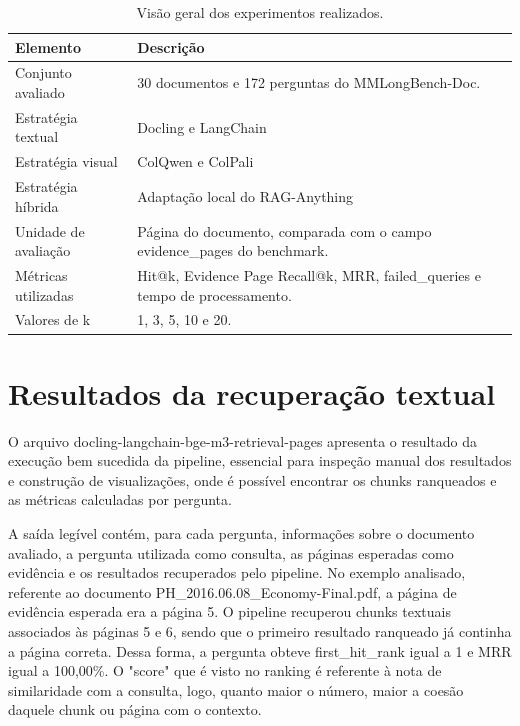 \begin{table}[htbp]
\centering
\caption{Visão geral dos experimentos realizados.}
\label{tab:visao-geral-experimentos}
\small
\begin{tabular}{p{4.0cm}p{9.2cm}}
\toprule
\textbf{Elemento} & \textbf{Descrição} \\
\midrule
Conjunto avaliado & 30 documentos e 172 perguntas do MMLongBench-Doc. \\
\addlinespace
Estratégia textual & Docling e LangChain \\
\addlinespace
Estratégia visual & ColQwen e ColPali \\
\addlinespace
Estratégia híbrida & Adaptação local do RAG-Anything \\
\addlinespace
Unidade de avaliação & Página do documento, comparada com o campo evidence\_pages do benchmark. \\
\addlinespace
Métricas utilizadas & Hit@k, Evidence Page Recall@k, MRR, failed\_queries e tempo de processamento. \\
\addlinespace
Valores de k & 1, 3, 5, 10 e 20. \\
\bottomrule
\end{tabular}
\end{table}


\section{Resultados da recuperação textual}

O arquivo docling-langchain-bge-m3-retrieval-pages apresenta o resultado da execução bem sucedida da pipeline, essencial para inspeção manual dos resultados e construção de visualizações, onde é possível encontrar os chunks ranqueados e as métricas calculadas por pergunta.

A saída legível contém, para cada pergunta, informações sobre o documento avaliado, a pergunta utilizada como consulta, as páginas esperadas como evidência e os resultados recuperados pelo pipeline. No exemplo analisado, referente ao documento PH\_2016.06.08\_Economy-Final.pdf, a página de evidência esperada era a página 5. O pipeline recuperou chunks textuais associados às páginas 5 e 6, sendo que o primeiro resultado ranqueado já continha a página correta. Dessa forma, a pergunta obteve first\_hit\_rank igual a 1 e MRR igual a 100,00\%. O "score" que é visto no ranking é referente à nota de similaridade com a consulta, logo, quanto maior o número, maior a coesão daquele chunk ou página com o contexto.


